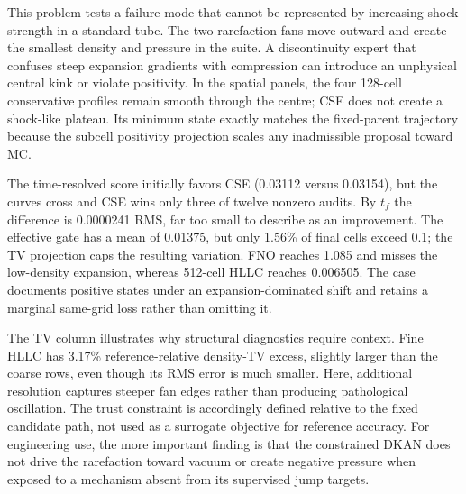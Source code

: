 \documentclass[10pt,twocolumn]{article}
\begin{document}
This problem tests a failure mode that cannot be represented by increasing shock strength in a standard tube. The two rarefaction fans move outward and create the smallest density and pressure in the suite. A discontinuity expert that confuses steep expansion gradients with compression can introduce an unphysical central kink or violate positivity. In the spatial panels, the four 128-cell conservative profiles remain smooth through the centre; CSE does not create a shock-like plateau. Its minimum state exactly matches the fixed-parent trajectory because the subcell positivity projection scales any inadmissible proposal toward MC.

The time-resolved score initially favors CSE (0.03112 versus 0.03154), but the curves cross and CSE wins only three of twelve nonzero audits. By $t_f$ the difference is 0.0000241 RMS, far too small to describe as an improvement. The effective gate has a mean of 0.01375, but only 1.56\% of final cells exceed 0.1; the TV projection caps the resulting variation. FNO reaches 1.085 and misses the low-density expansion, whereas 512-cell HLLC reaches 0.006505. The case documents positive states under an expansion-dominated shift and retains a marginal same-grid loss rather than omitting it.

The TV column illustrates why structural diagnostics require context. Fine HLLC has 3.17\% reference-relative density-TV excess, slightly larger than the coarse rows, even though its RMS error is much smaller. Here, additional resolution captures steeper fan edges rather than producing pathological oscillation. The trust constraint is accordingly defined relative to the fixed candidate path, not used as a surrogate objective for reference accuracy. For engineering use, the more important finding is that the constrained DKAN does not drive the rarefaction toward vacuum or create negative pressure when exposed to a mechanism absent from its supervised jump targets.
\end{document}
